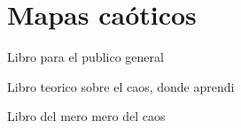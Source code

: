 \chapter{Mapas caóticos}

Libro para el publico general \cite{Gleick1987}

Libro teorico sobre el caos, donde aprendi  \cite{Strogatz1994}

Libro del mero mero del caos \cite{Sprott2003}

    \section{}

    \section{}

    \section{}
